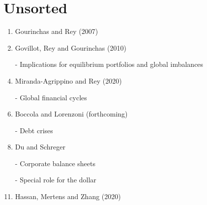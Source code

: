 \documentclass[12pt,letter]{article}
\theoremstyle{break} \theorembodyfont{\normalfont\itshape}
\theoremstyle{break}
\theoremstyle{break} \theorembodyfont{\normalfont\itshape}
\theoremstyle{break} \theorembodyfont{\normalfont\itshape}
\begin{document}
\section{Unsorted}
\begin{enumerate}
\item Gourinchas and Rey (2007)
\item Govillot, Rey and Gourinchas (2010)
\item[-] Implications for equilibrium portfolios and global imbalances
\item Miranda-Agrippino and Rey (2020)
\item[-] Global financial cycles
\item Boccola and Lorenzoni (forthcoming)
\item[-] Debt crises
\item Du and Schreger
\item[-] Corporate balance sheets
\item[-] Special role for the dollar
\item Hassan, Mertens and Zhang (2020)
\end{enumerate}
\end{document}
